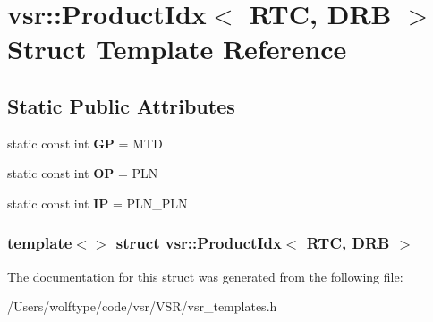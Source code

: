 \hypertarget{structvsr_1_1_product_idx_3_01_r_t_c_00_01_d_r_b_01_4}{\section{vsr\-:\-:Product\-Idx$<$ R\-T\-C, D\-R\-B $>$ Struct Template Reference}
\label{structvsr_1_1_product_idx_3_01_r_t_c_00_01_d_r_b_01_4}
}
\subsection*{Static Public Attributes}
\begin{DoxyCompactItemize}
\item 
\hypertarget{structvsr_1_1_product_idx_3_01_r_t_c_00_01_d_r_b_01_4_a05f31566c3b46ff8f84c9f248ff08cc9}{static const int {\bfseries G\-P} = M\-T\-D}\label{structvsr_1_1_product_idx_3_01_r_t_c_00_01_d_r_b_01_4_a05f31566c3b46ff8f84c9f248ff08cc9}

\item 
\hypertarget{structvsr_1_1_product_idx_3_01_r_t_c_00_01_d_r_b_01_4_a447b60b3229a86c482d91e48ba9ab3b6}{static const int {\bfseries O\-P} = P\-L\-N}\label{structvsr_1_1_product_idx_3_01_r_t_c_00_01_d_r_b_01_4_a447b60b3229a86c482d91e48ba9ab3b6}

\item 
\hypertarget{structvsr_1_1_product_idx_3_01_r_t_c_00_01_d_r_b_01_4_ad2218ae5a979efb88da6667cd0d92583}{static const int {\bfseries I\-P} = P\-L\-N\-\_\-\-P\-L\-N}\label{structvsr_1_1_product_idx_3_01_r_t_c_00_01_d_r_b_01_4_ad2218ae5a979efb88da6667cd0d92583}

\end{DoxyCompactItemize}
\subsubsection*{template$<$$>$ struct vsr\-::\-Product\-Idx$<$ R\-T\-C, D\-R\-B $>$}



The documentation for this struct was generated from the following file\-:\begin{DoxyCompactItemize}
\item 
/\-Users/wolftype/code/vsr/\-V\-S\-R/vsr\-\_\-templates.\-h\end{DoxyCompactItemize}
